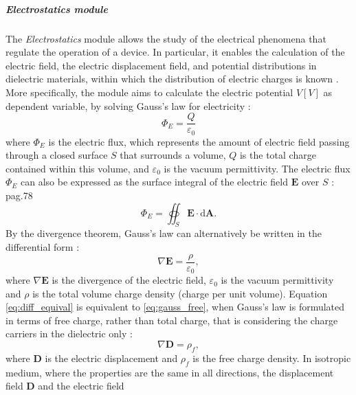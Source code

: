 \subparagraph{Electrostatics module}
The \emph{Electrostatics} module allows the study of the electrical phenomena
that regulate the operation of a device. In particular, it enables the
calculation of the electric field, the electric displacement field, and
potential distributions in dielectric materials, within which the distribution
of electric charges is known \citep{comsolCOMSOL_manual}. More specifically, the
module aims to calculate the electric potential $V [V]$ as dependent variable,
by solving Gauss's law for electricity \citep{grantElectromagnetism2008}:
%
\begin{equation}
    \Phi_E = \dfrac{Q}{\varepsilon_0}
\end{equation}
%
where $\Phi_E$ is the electric flux, which represents the amount of electric
field passing through a closed surface $S$ that surrounds a volume, $Q$ is the
total charge contained within this volume, and $\varepsilon_0$ is the vacuum
permittivity. The electric flux $\Phi_E$ can also be expressed as the surface
integral of the electric field $\mathbf{E}$ over $S$
\citep{purcellElectricity2013}:
pag.78
%
\begin{equation}
    \Phi _{E}= \oiint_S \mathbf{E} \cdot \mathrm{d} \mathbf{A}.
\end{equation}
%
By the divergence theorem, Gauss's law can alternatively be written in the
differential form \citep{purcellElectricity2013}:
%
\begin{equation}
    \label{eq:diff_equival}
     \nabla \mathbf{E} = \dfrac{\rho}{\varepsilon_0},
\end{equation}
%
where $\nabla \mathbf{E}$ is the divergence of the electric field,
$\varepsilon_0$ is the vacuum permittivity and $\rho$ is the total volume charge
density (charge per unit volume). Equation \eqref{eq:diff_equival} is equivalent
to \eqref{eq:gauss_free}, when Gauss's law is formulated in terms of free
charge, rather than total charge, that is considering the charge carriers in the
dielectric only \citep{griffithsIntroduction2023}:
%
\begin{equation}
    \label{eq:gauss_free}
    \nabla \mathbf{D} = \rho_f ,
\end{equation}
%
where $\mathbf{D}$ is the electric displacement and $\rho_f$ is the free charge
density. In isotropic medium, where the properties are the same in all
directions, the displacement field $\mathbf{D}$ and the electric field
